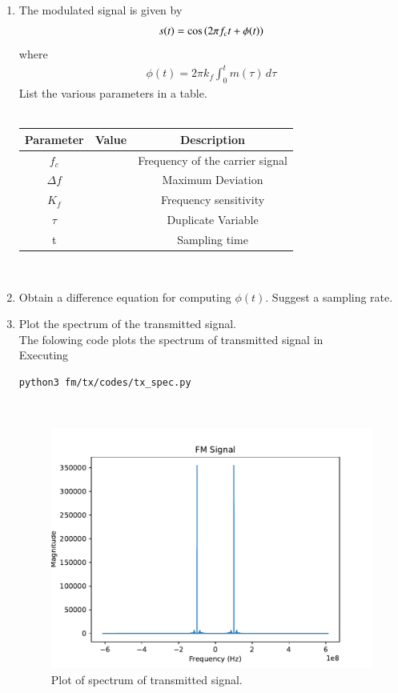 \begin{enumerate}[label=\arabic*.,ref=\thesection.\theenumi]
\item The modulated signal is given by 
\begin{align}
	s(t) = \cos\left(2\pi f_c t + \phi(t)\right)
\end{align}
where
\begin{align}
	\phi(t) = 2\pi k_f \int_{0}^{t}m(\tau)\,d\tau
\end{align}
List the various parameters in a table.
\\
\solution
\\
\begin{tabular}{|c|l|c|}
    \hline 
    \textbf{Parameter} & \textbf{Value} &\textbf{Description} \\ \hline
    $f_c $&  & Frequency of the carrier signal\\
    $\Delta{f}$ &  & Maximum Deviation \\  
    $K_{f}$ &  & Frequency sensitivity \\ 
    $\tau$ &  & Duplicate Variable\\ 
    t     &  & Sampling time\\  \hline
    \end{tabular}
    \\
\item Obtain a difference equation for computing $\phi(t)$.  Suggest a sampling rate.
\\
\solution
\item Plot the spectrum of the transmitted signal.
\\
\solution
The folowing code plots the spectrum of transmitted signal in 
\\
Executing
\begin{lstlisting}
python3 fm/tx/codes/tx_spec.py
\end{lstlisting}\\
\begin{figure}[H]
\centering	
\includegraphics[width=\columnwidth]{fm/tx/figs/tx_spec.pdf} 
\caption{Plot of spectrum of transmitted signal.}
\label{fig:Trans}
\end{figure}


\end{enumerate}
